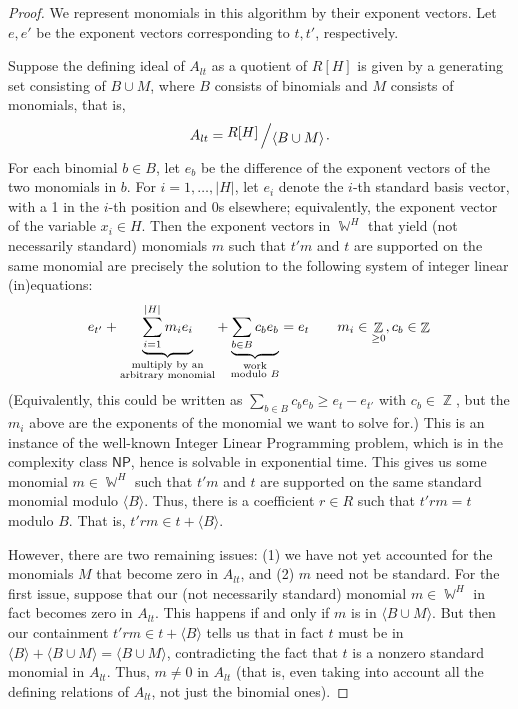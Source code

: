 \documentclass[11pt,reqno]{amsart}
\DeclareMathOperator{\Z}{\mathbb{Z}}
\DeclareMathOperator{\W}{\mathbb{W}}
\newcommand{\bigslant}[2]{{\raisebox{.2em}{$#1$}\left/\raisebox{-.2em}{$#2$}\right.}}
\theoremstyle{definition}
\numberwithin{equation}{section}
\begin{document}
\begin{proof}
We represent monomials in this algorithm by their exponent vectors. Let $e,e'$ be the exponent vectors corresponding to $t,t'$, respectively.

Suppose the defining ideal of $A_{lt}$ as a quotient of $R[H]$ is given by a generating set consisting of $B \cup M$, where $B$ consists of binomials and $M$ consists of monomials, that is, 
\[
A_{lt} = \bigslant{R[H]}{\langle B \cup M \rangle}.
\] 
For each binomial $b \in B$, let $e_b$ be the difference of the exponent vectors of the two monomials in $b$. For $i=1,\dotsc,|H|$, let $e_i$ denote the $i$-th standard basis vector, with a 1 in the $i$-th position and 0s elsewhere; equivalently, the exponent vector of the variable $x_i \in H$. Then the exponent vectors in $\W^H$ that yield (not necessarily standard) monomials $m$ such that $t'm$ and $t$ are supported on the same monomial are precisely the solution to the following system of integer linear (in)equations:
\[
e_{t'} + \underbrace{\sum_{i=1}^{|H|} m_i e_i}_{\substack{\text{multiply by an} \\ \text{arbitrary monomial}}} + \underbrace{\sum_{b \in B} c_b e_b}_{\substack{\text{work} \\ \text{modulo } B}}  = e_t \qquad m_i \in \Z_{\geq 0}, c_b \in \Z \\
\]
(Equivalently, this could be written as $\sum_{b \in B} c_b e_b \geq e_t - e_{t'}$ with $c_b \in \Z$, but the $m_i$ above are the exponents of the monomial we want to solve for.) 
This is an instance of the well-known Integer Linear Programming problem, which is in the complexity class $\mathsf{NP}$, hence is solvable in exponential time. This gives us some monomial $m \in \W^H$ such that $t'm$ and $t$ are supported on the same standard monomial modulo $\langle B \rangle$. Thus, there is a coefficient $r \in R$ such that $t' rm = t$ modulo $B$. That is, $t'rm \in t + \langle B \rangle$.

However, there are two remaining issues: (1) we have not yet accounted for the monomials $M$ that become zero in $A_{lt}$, and (2) $m$ need not be standard.  For the first issue, suppose that our (not necessarily standard) monomial $m \in \W^H$ in fact becomes zero in $A_{lt}$. This happens if and only if $m$ is in $\langle B \cup M \rangle$. But then our containment $t'rm \in t + \langle B \rangle$ tells us that in fact $t$ must be in $\langle B \rangle + \langle B \cup M \rangle = \langle B \cup M \rangle$, contradicting the fact that $t$ is a nonzero standard monomial in $A_{lt}$. Thus, $m \neq 0$ in $A_{lt}$ (that is, even taking into account all the defining relations of $A_{lt}$, not just the binomial ones).


\end{proof}
\end{document}
